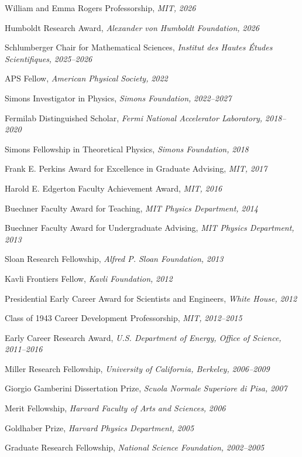 \bbl
\item William and Emma Rogers Professorship, \emph{MIT, }\emph{2026}
\item Humboldt Research Award, \emph{Alexander von Humboldt Foundation, }\emph{2026}
\item Schlumberger Chair for Mathematical Sciences, \emph{Institut des Hautes Études Scientifiques, }\emph{2025--2026}
\item APS Fellow, \emph{American Physical Society, }\emph{2022}
\item Simons Investigator in Physics, \emph{Simons Foundation, }\emph{2022--2027}
\item Fermilab Distinguished Scholar, \emph{Fermi National Accelerator Laboratory, }\emph{2018--2020}
\item Simons Fellowship in Theoretical Physics, \emph{Simons Foundation, }\emph{2018}
\item Frank E. Perkins Award for Excellence in Graduate Advising, \emph{MIT, }\emph{2017}
\item Harold E. Edgerton Faculty Achievement Award, \emph{MIT, }\emph{2016}
\item Buechner Faculty Award for Teaching, \emph{MIT Physics Department, }\emph{2014}
\item Buechner Faculty Award for Undergraduate Advising, \emph{MIT Physics Department, }\emph{2013}
\item Sloan Research Fellowship, \emph{Alfred P. Sloan Foundation, }\emph{2013}
\item Kavli Frontiers Fellow, \emph{Kavli Foundation, }\emph{2012}
\item Presidential Early Career Award for Scientists and Engineers, \emph{White House, }\emph{2012}
\item Class of 1943 Career Development Professorship, \emph{MIT, }\emph{2012--2015}
\item Early Career Research Award, \emph{U.S. Department of Energy, Office of Science, }\emph{2011--2016}
\item Miller Research Fellowship, \emph{University of California, Berkeley, }\emph{2006--2009}
\item Giorgio Gamberini Dissertation Prize, \emph{Scuola Normale Superiore di Pisa, }\emph{2007}
\item Merit Fellowship, \emph{Harvard Faculty of Arts and Sciences, }\emph{2006}
\item Goldhaber Prize, \emph{Harvard Physics Department, }\emph{2005}
\item Graduate Research Fellowship, \emph{National Science Foundation, }\emph{2002--2005}
\el
